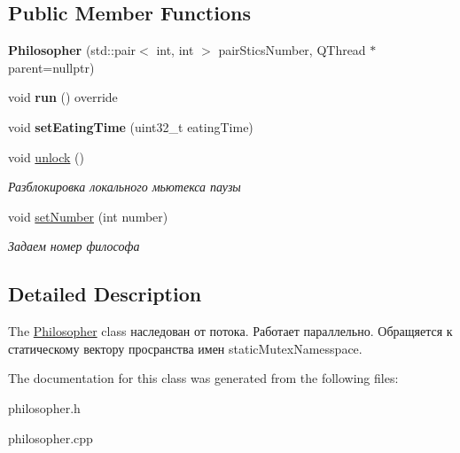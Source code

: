 \subsection*{Public Member Functions}
\begin{DoxyCompactItemize}
\item 
\mbox{\label{classPhilosopher_a572f3abf04e32477ee7ce750f0f520db}} 
{\bfseries Philosopher} (std\+::pair$<$ int, int $>$ pair\+Stics\+Number, Q\+Thread $\ast$parent=nullptr)
\item 
\mbox{\label{classPhilosopher_ae91a3b0f2b22a0b5524a4a5a8948dbad}} 
void {\bfseries run} () override
\item 
\mbox{\label{classPhilosopher_a438211c391df3d9e6e1dcf69ef2de6b0}} 
void {\bfseries set\+Eating\+Time} (uint32\+\_\+t eating\+Time)
\item 
\mbox{\label{classPhilosopher_a69ba537ec32602e1940d09dd1bc4acf2}} 
void \hyperlink{classPhilosopher_a69ba537ec32602e1940d09dd1bc4acf2}{unlock} ()
\begin{DoxyCompactList}\small\item\em Разблокировка локального мьютекса паузы \end{DoxyCompactList}\item 
\mbox{\label{classPhilosopher_a5f41e156a9dbbc7190ad3092df82455c}} 
void \hyperlink{classPhilosopher_a5f41e156a9dbbc7190ad3092df82455c}{set\+Number} (int number)
\begin{DoxyCompactList}\small\item\em Задаем номер философа \end{DoxyCompactList}\end{DoxyCompactItemize}


\subsection{Detailed Description}
The \hyperlink{classPhilosopher}{Philosopher} class наследован от потока. Работает параллельно. Обращяется к статическому вектору просранства имен static\+Mutex\+Namesspace. 

The documentation for this class was generated from the following files\+:\begin{DoxyCompactItemize}
\item 
philosopher.\+h\item 
philosopher.\+cpp\end{DoxyCompactItemize}
